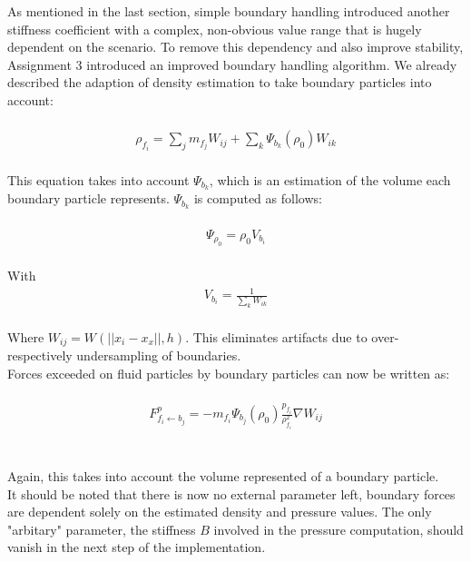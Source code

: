 \documentclass{ACGSeminar}
\begin{document}
As mentioned in the last section, simple boundary handling introduced another stiffness coefficient with a complex, non-obvious value range that is hugely dependent on the scenario. To remove this dependency and also improve stability, Assignment 3 introduced an improved boundary handling algorithm. We already described the adaption of density estimation to take boundary particles into account:\\
\\
\begin{equation} 
\begin{aligned}
\rho_{f_{i}} = \sum_{j}m_{f_{j}}W_{ij} + \sum_{k}\Psi_{b_{k}}(\rho_{0})W_{ik}
\end{aligned}
\end{equation}
\\
This equation takes into account \(\Psi_{b_{k}}\), which is an estimation of the volume each boundary particle represents.
\(\Psi_{b_{k}}\) is computed as follows:\\
\\
\begin{equation} 
\begin{aligned}
\Psi_{\rho_{0}} = \rho_{0}V_{b_{i}}
\end{aligned}
\end{equation}
\\
With 
\begin{equation} 
\begin{aligned}
V_{b_{i}} = \frac{1}{\sum_{k}W_{ik}} 
\end{aligned}
\end{equation}\\
Where \(W_{ij} = W(||x_{i} - x_{x}||, h)\).
This eliminates artifacts due to over- respectively undersampling of boundaries.\\
Forces exceeded on fluid particles by boundary particles can now be written as:\\
\\
\begin{equation} 
\begin{aligned}
F^{p}_{f_{i} \leftarrow b_{j}} = -m_{f_{i}}\Psi_{b_{j}}(\rho_{0})\frac{p_{f_{i}}}{\rho^{2}_{f_{i}}}\nabla W_{ij}
\end{aligned}
\end{equation}\\
\\
Again, this takes into account the volume represented of a boundary particle.\\
It should be noted that there is now no external parameter left, boundary forces are dependent solely on the estimated density and pressure values. The only "arbitary" parameter, the stiffness \(B\) involved in the pressure computation, should vanish in the next step of the implementation.\\
\end{document}
